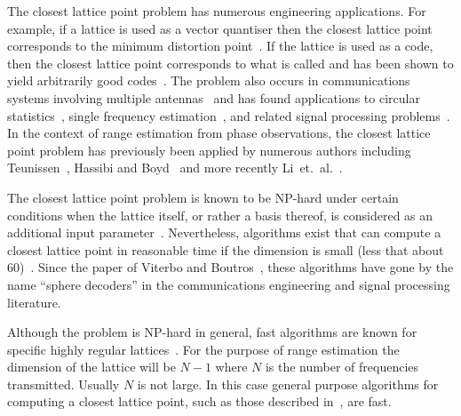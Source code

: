 The closest lattice point problem has numerous engineering applications.  For example, if a lattice is used as a vector quantiser then the closest lattice point corresponds to the minimum distortion point~\cite{Conway1983VoronoiCodes,Conway1982VoronoiRegions,Conway1982FastQuantDec}.  If the lattice is used as a code, then the closest lattice point corresponds to what is called  and has been shown to yield arbitrarily good codes~\cite{Erex2004_lattice_decoding,Erez2005}.  The problem also occurs in communications systems involving multiple antennas~\cite{Ryan2008,Wubben_2011} and has found applications to circular statistics~\cite{McKilliam_mean_dir_est_sq_arc_length2010}, single frequency estimation~\cite{McKilliamFrequencyEstimationByPhaseUnwrapping2009}, and related signal processing problems~\cite{McKilliam2007,Clarkson2007,McKilliam2009IndentifiabliltyAliasingPolyphase,Quinn_sparse_noisy_SSP_2012}.  In the context of range estimation from phase observations, the closest lattice point problem has previously been applied by numerous authors including Teunissen~\cite{Teunissen_GPS_1995}, Hassibi and Boyd~\cite{Hassibi_GPS_1998} and more recently Li~et.~al.~\cite{Li_distance_est_wrapped_phase}.

The closest lattice point problem is known to be NP-hard under certain conditions when the lattice itself, or rather a basis thereof, is considered as an additional input parameter~\cite{micciancio_hardness_2001, Dinur2003_approximating_CVP_NP_hard, Jalden2005_sphere_decoding_complexity}. Nevertheless, algorithms exist that can compute a closest lattice point in reasonable time if the dimension is small (less that about 60)~\cite{Pohst_sphere_decoder_1981,Kannan1987_fast_general_np,Agrell2002,Viterbo_sphere_decoder_1999,Micciancio09adeterministic,schnorr_euchner_sd_1994}.  Since the paper of Viterbo and Boutros~\cite{Viterbo_sphere_decoder_1999}, these algorithms have gone by the name ``sphere decoders'' in the communications engineering and signal processing literature. 

Although the problem is NP-hard in general, fast algorithms are known for specific highly regular lattices~\cite{Conway1982FastQuantDec, Conway1986SoftDecLeechGolay,McKilliam2009CoxeterLattices, McKilliam_closest_point_lattice_first_kind_2014}.  For the purpose of range estimation the dimension of the lattice will be $N-1$ where $N$ is the number of frequencies transmitted.  Usually $N$ is not large.  In this case general purpose algorithms for computing a closest lattice point, such as those described in~\cite{Agrell2002}, are fast. 



